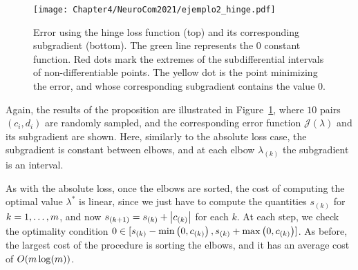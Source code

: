 \begin{figure}[t!]
    \centering
    \texttt{[image: Chapter4/NeuroCom2021/ejemplo2\_hinge.pdf]}
    \caption{Error using the hinge loss function (top) and its corresponding subgradient (bottom). The green line represents the $0$ constant function. Red dots mark the extremes of the subdifferential intervals of non-differentiable points. The yellow dot is the point minimizing the error, and whose corresponding subgradient contains the value $0$.}
    \label{fig:hinge_error}
\end{figure}

Again, the results of the proposition are illustrated in Figure~\ref{fig:hinge_error}, where $10$ pairs $(c_i, d_i)$ are randomly sampled, and the corresponding error function $\mathcal{J}(\lambda)$ and its subgradient are shown. Here, similarly to the absolute loss case, the subgradient is constant between elbows, and at each elbow $\lambda_{(k)}$ the subgradient is an interval.

As with the absolute loss, once the elbows are sorted, the cost of computing the optimal value $\lambda^*$ is linear, since we just have to compute the quantities $s_{(k)}$ for $k=1, \ldots, m$, and now $s_{(k+1)} = s_{(k)} + \left|c_{(k)}\right|$  for each $k$. At each step, we check the optimality condition $0 \in [s_{(k)} - \min\left(0, c_{(k)}\right), s_{(k)} + \max\left(0, c_{(k)}\right)]$.
As before, the largest cost of the procedure is sorting the elbows, and it has an average cost of $O(m \log(m))$.

